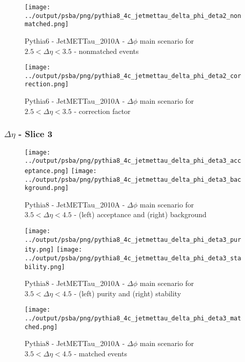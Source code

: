 \documentclass[11pt]{book}
\begin{document}
\begin{figure}[ht]
\centering
\texttt{[image: ../output/psba/png/pythia8\_4c\_jetmettau\_delta\_phi\_deta2\_nonmatched.png]}
\caption{Pythia6 - JetMETTau\_2010A - $\Delta\phi$ main scenario for $2.5 < \Delta\eta < 3.5$ - nonmatched events}
\label{fig:p6_jetmettau_delta_phi_deta2_nonmatched}
\end{figure}

\begin{figure}[ht]
\centering
\texttt{[image: ../output/psba/png/pythia8\_4c\_jetmettau\_delta\_phi\_deta2\_correction.png]}
\caption{Pythia6 - JetMETTau\_2010A - $\Delta\phi$ main scenario for $2.5 < \Delta\eta < 3.5$ - correction factor}
\label{fig:p6_jetmettau_delta_phi_deta2_correction}
\end{figure}

\clearpage
\subsubsection{$\Delta\eta$ - Slice 3}

\begin{figure}[ht]
\centering
\texttt{[image: ../output/psba/png/pythia8\_4c\_jetmettau\_delta\_phi\_deta3\_acceptance.png]}
\texttt{[image: ../output/psba/png/pythia8\_4c\_jetmettau\_delta\_phi\_deta3\_background.png]}
\caption{Pythia8 - JetMETTau\_2010A - $\Delta\phi$ main scenario for $3.5 < \Delta\eta < 4.5$ - (left) acceptance and (right) background}
\label{fig:p8_jetmettau_delta_phi_deta3_ab}
\end{figure}

\begin{figure}[ht]
\centering
\texttt{[image: ../output/psba/png/pythia8\_4c\_jetmettau\_delta\_phi\_deta3\_purity.png]}
\texttt{[image: ../output/psba/png/pythia8\_4c\_jetmettau\_delta\_phi\_deta3\_stability.png]}
\caption{Pythia8 - JetMETTau\_2010A - $\Delta\phi$ main scenario for $3.5 < \Delta\eta < 4.5$ - (left) purity and (right) stability}
\label{fig:p8_jetmettau_delta_phi_deta3_ps}
\end{figure}

\begin{figure}[ht]
\centering
\texttt{[image: ../output/psba/png/pythia8\_4c\_jetmettau\_delta\_phi\_deta3\_matched.png]}
\caption{Pythia8 - JetMETTau\_2010A - $\Delta\phi$ main scenario for $3.5 < \Delta\eta < 4.5$ - matched events}
\label{fig:p8_jetmettau_delta_phi_deta3_matched}
\end{figure}
\end{document}
